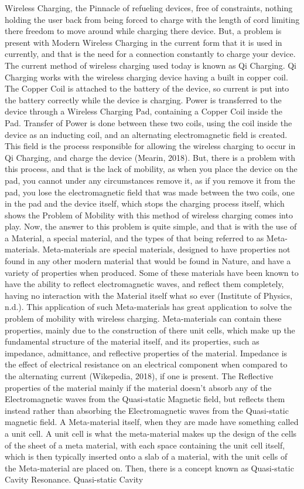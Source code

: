 \documentclass[]{article}
\begin{document}
Wireless Charging, the Pinnacle of refueling devices, free of constraints, nothing holding the user back from being forced to charge with the length of cord limiting there freedom to move around while charging there device. But, a problem is present with Modern Wireless Charging in the current form that it is used in currently, and that is the need for a connection constantly to charge your device. The current method of wireless charging used today is known as Qi Charging. Qi Charging works with the wireless charging device having a built in copper coil. The Copper Coil is attached to the battery of the device, so current is put into the battery correctly while the device is charging. Power is transferred to the device through a Wireless Charging Pad, containing a Copper Coil inside the Pad. Transfer of Power is done between these two coils, using the coil inside the device as an inducting coil, and an alternating electromagnetic field is created. This field is the process responsible for allowing the wireless charging to occur in Qi Charging, and charge the device (Mearin, 2018). But, there is a problem with this process, and that is the lack of mobility, as when you place the device on the pad, you cannot under any circumstances remove it, as if you remove it from the pad, you lose the electromagnetic field that was made between the two coils, one in the pad and the device itself, which stops the charging process itself, which shows the Problem of Mobility with this method of wireless charging comes into play. Now, the answer to this problem is quite simple, and that is with the use of a Material, a special material, and the types of that being referred to as Meta-materials. Meta-materials are special materials, designed to have properties not found in any other modern material that would be found in Nature, and have a variety of properties when produced. Some of these materials have been known to have the ability to reflect electromagnetic waves, and reflect them completely, having no interaction with the Material itself what so ever (Institute of Physics, n.d.). This application of such Meta-materials has great application to solve the problem of mobility with wireless charging. Meta-materials can contain these properties, mainly due to the construction of there unit cells, which make up the fundamental structure of the material itself, and its properties, such as impedance, admittance, and reflective properties of the material. Impedance is the effect of electrical resistance on an electrical component when compared to the alternating current (Wikepedia, 2018), if one is present. The Reflective properties of the material mainly if the material doesn't absorb any of the Electromagnetic waves from the Quasi-static Magnetic field, but reflects them instead rather than absorbing the Electromagnetic waves from the Quasi-static magnetic field. A Meta-material itself, when they are made have something called a unit cell. A unit cell is what the meta-material makes up the design of the cells of the sheet of a meta material, with each space containing the unit cell itself, which is then typically inserted onto a slab of a material, with the unit cells of the Meta-material are placed on. Then, there is a concept known as Quasi-static Cavity Resonance. Quasi-static Cavity 
\end{document}
